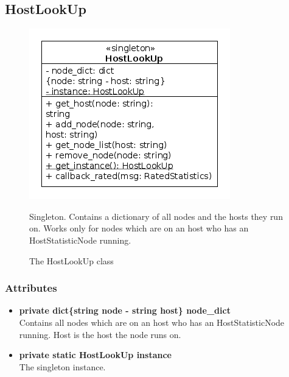 \subsection{HostLookUp}
\begin{figure}[htbp]
	\begin{minipage}[t]{8cm}
		\vspace{0pt}
		\centering
		\includegraphics[scale=0.6]{./diagram_pictures/reactor/HostLookUp.png}
		\caption{The HostLookUp class}
	\end{minipage}
	\hfill
	\begin{minipage}[t]{8cm}
		\vspace{10pt}
			Singleton. Contains a dictionary of all nodes and the hosts they run on. Works only for nodes which are on an host who has an HostStatisticNode running.
	\end{minipage}
\end{figure}  


\subsubsection{Attributes}
\begin{itemize}
	\item \textbf{ private dict\{string node - string host\} node\_dict }\\
		Contains all nodes which are on an host who has an HostStatisticNode running. Host is the host the node runs on.
	\item \textbf{ private static HostLookUp instance }\\
		The singleton instance.
\end{itemize}
